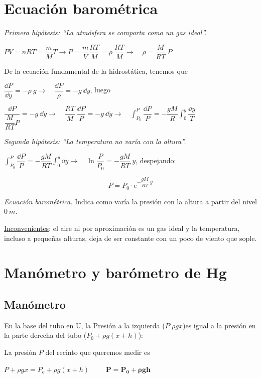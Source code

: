 \section{Ecuación barométrica}

\emph{Primera hipótesis: ``La atmósfera se comporta como un gas ideal''.} 

$PV=n R T=\dfrac m M T \to P= \dfrac m V \dfrac {RT}{M}=\rho \ \dfrac {RT}M \to \quad \rho=\dfrac M {RT}\ P$

De la ecuación fundamental de la hidrostática, tenemos que 

$\displaystyle \dfrac{\dd P}{\dd y}=-\rho\ g \to \quad \dfrac {\dd P}{\rho}=-g \ \dd y$, luego

$\dfrac{\dd P}{\dfrac {M}{RT} P}=-g \ \dd y \to \quad \dfrac {RT}M \ \dfrac {\dd P}P=-g\ \dd y \to \quad \displaystyle \int_{P_0}^P \dfrac {\dd P}P=-\dfrac {gM}{R} \int_0^y \dfrac{\dd y}{T}$

\emph{Segunda hipótesis: ``La temperatura no varía con la altura''.}

$\displaystyle \int_{P_0}^P \dfrac {\dd P}P=-\dfrac {gM}{RT} \int_0^y \dd y \to \quad \ln \dfrac P {P_0}=-\dfrac{gM}{RT}\ y$, despejando:

\begin{equation}
P=P_0\cdot e^{- \dfrac{gM}{RT}\ y}	
\end{equation}

\emph{Ecuación barométrica.} Indica como varía la presión con la altura a partir del nivel $0\ m$.

\underline{Inconvenientes}: el aire ni por aproximación es un gas ideal y la temperatura, incluso a pequeñas alturas, deja de ser constante con un poco de viento que sople.

\section{Manómetro y barómetro de Hg} 

\subsection{Manómetro}

En la base del tubo en U, la Presión a la izquierda ($P'\rho g x$)es igual a la presión en la parte derecha del tubo ($P_0+\rho g (x+h)$): 

La presión $P$ del recinto que queremos medir es

$P+\rho g x=P_o+\rho g (x+h) \qquad $
$\boldsymbol{P=P_0+\rho g h}$



